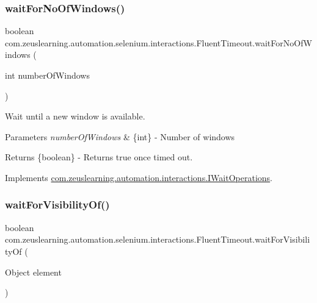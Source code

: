 \subsubsection{\texorpdfstring{wait\+For\+No\+Of\+Windows()}{waitForNoOfWindows()}}
{\footnotesize\ttfamily boolean com.\+zeuslearning.\+automation.\+selenium.\+interactions.\+Fluent\+Timeout.\+wait\+For\+No\+Of\+Windows (\begin{DoxyParamCaption}\item[{int}]{number\+Of\+Windows }\end{DoxyParamCaption})\hspace{0.3cm}{\ttfamily [inline]}}

Wait until a new window is available.


\begin{DoxyParams}{Parameters}
{\em number\+Of\+Windows} & \{int\} -\/ Number of windows \\
\hline
\end{DoxyParams}
\begin{DoxyReturn}{Returns}
\{boolean\} -\/ Returns {\ttfamily true} once timed out. 
\end{DoxyReturn}


Implements \hyperlink{interfacecom_1_1zeuslearning_1_1automation_1_1interactions_1_1IWaitOperations_a609fd66e35b8217e83f499999785b370}{com.\+zeuslearning.\+automation.\+interactions.\+I\+Wait\+Operations}.

\hypertarget{classcom_1_1zeuslearning_1_1automation_1_1selenium_1_1interactions_1_1FluentTimeout_a189fae4d5e9985013b0e1b65c3d73d1f}{}\label{classcom_1_1zeuslearning_1_1automation_1_1selenium_1_1interactions_1_1FluentTimeout_a189fae4d5e9985013b0e1b65c3d73d1f} 
\subsubsection{\texorpdfstring{wait\+For\+Visibility\+Of()}{waitForVisibilityOf()}\hspace{0.1cm}{\footnotesize\ttfamily [1/2]}}
{\footnotesize\ttfamily boolean com.\+zeuslearning.\+automation.\+selenium.\+interactions.\+Fluent\+Timeout.\+wait\+For\+Visibility\+Of (\begin{DoxyParamCaption}\item[{Object}]{element }\end{DoxyParamCaption})\hspace{0.3cm}{\ttfamily [inline]}}

